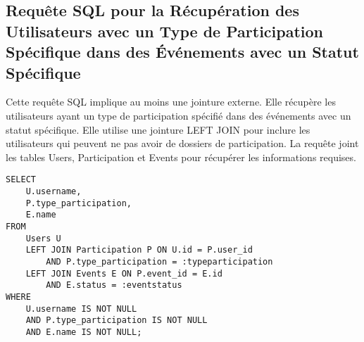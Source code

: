 \subsection{Requête SQL pour la Récupération des Utilisateurs avec un Type de Participation Spécifique dans des Événements avec un Statut Spécifique}

Cette requête SQL implique au moins une jointure externe. Elle récupère les utilisateurs ayant un type de participation spécifié dans des événements avec un statut spécifique. Elle utilise une jointure LEFT JOIN pour inclure les utilisateurs qui peuvent ne pas avoir de dossiers de participation. La requête joint les tables Users, Participation et Events pour récupérer les informations requises.

\begin{lstlisting}
SELECT
    U.username,
    P.type_participation,
    E.name
FROM
    Users U
    LEFT JOIN Participation P ON U.id = P.user_id
        AND P.type_participation = :typeparticipation
    LEFT JOIN Events E ON P.event_id = E.id
        AND E.status = :eventstatus
WHERE
    U.username IS NOT NULL
    AND P.type_participation IS NOT NULL
    AND E.name IS NOT NULL;
\end{lstlisting}